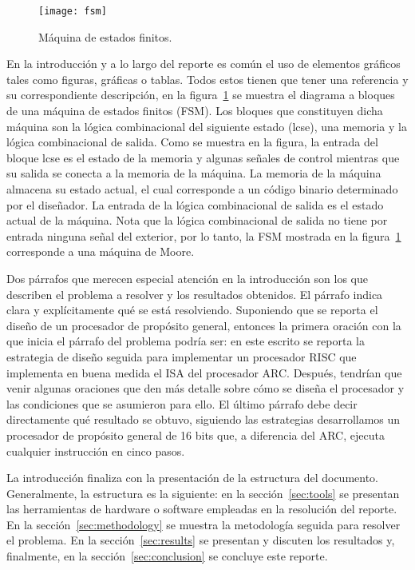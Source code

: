 \documentclass[12pt]{article}
\begin{document}
\begin{figure}[t] %
  \centering
  \texttt{[image: fsm]}
  \caption{Máquina de estados finitos.}
  \label{fig:fsm}
\end{figure}

En la introducción y a lo largo del reporte es común el uso de elementos 
gráficos tales como figuras, gráficas o tablas. Todos estos tienen que tener 
una referencia y su correspondiente descripción, \eg en la 
figura~\ref{fig:fsm} se muestra el diagrama a bloques de una máquina de estados 
finitos (FSM). Los bloques que constituyen dicha máquina son la lógica 
combinacional del siguiente estado (lcse), una memoria y la lógica combinacional 
de salida. Como se muestra en la figura, la entrada del bloque lcse es el estado 
de la memoria y algunas señales de control mientras que su salida se conecta a 
la memoria de la máquina. La memoria de la máquina almacena su estado actual, 
el cual corresponde a un código binario determinado por el diseñador. 
La entrada de la lógica combinacional de salida es el estado actual de la 
máquina. Nota que la lógica combinacional de salida no tiene por entrada ninguna 
señal del exterior, por lo tanto, la FSM mostrada en la figura~\ref{fig:fsm} 
corresponde a una máquina de Moore.

Dos párrafos que merecen especial atención en la introducción son los que 
describen el problema a resolver y los resultados obtenidos. El párrafo indica 
clara y explícitamente qué se está resolviendo. Suponiendo que se reporta el 
diseño de un procesador de propósito general, entonces la primera oración con 
la que inicia el párrafo del problema podría ser: en este escrito se reporta la 
estrategia de diseño seguida para implementar un procesador RISC que implementa 
en buena medida el ISA del procesador ARC. Después, tendrían que venir algunas 
oraciones que den más detalle sobre cómo se diseña el procesador y las 
condiciones que se asumieron para ello. El último párrafo debe decir 
directamente qué resultado se obtuvo, \eg siguiendo las estrategias 
desarrollamos un procesador de propósito general de 16 bits que, a diferencia 
del ARC, ejecuta cualquier instrucción en cinco pasos.

La introducción finaliza con la presentación de la estructura del documento. 
Generalmente, la estructura es la siguiente: en la sección~\ref{sec:tools} se 
presentan las herramientas de hardware o software empleadas en la resolución 
del reporte. En la sección~\ref{sec:methodology} se muestra la metodología 
seguida para resolver el problema. En la sección~\ref{sec:results} se 
presentan y discuten los resultados y, finalmente, en la 
sección~\ref{sec:conclusion} se concluye este reporte.
\end{document}
